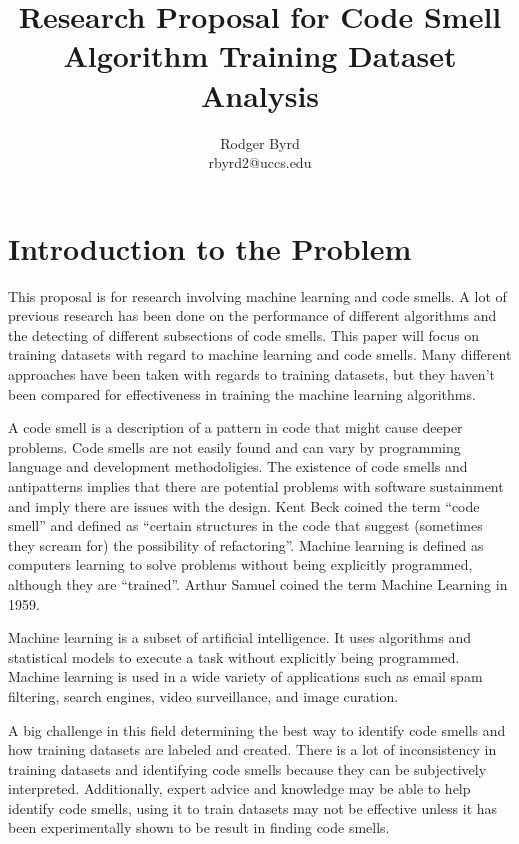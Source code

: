 \documentclass[conference]{IEEEtran}
\begin{document}

\title{Research Proposal for Code Smell Algorithm Training Dataset Analysis}
\author{Rodger Byrd\\rbyrd2@uccs.edu}
\maketitle

\section{Introduction to the Problem}
This proposal is for research involving machine learning and code smells.
A lot of previous research has been done on the performance of different algorithms and the detecting of different subsections of code smells.
This paper will focus on training datasets with regard to machine learning and code smells. 
Many different approaches have been taken with regards to training datasets, but they haven't been compared for effectiveness in training the machine learning algorithms.


A code smell is a description of a pattern in code that might cause deeper problems. 
Code smells are not easily found and can vary by programming language and development methodoligies.
The existence of code smells and antipatterns implies that there are potential problems with software sustainment and imply there are issues with the design.
Kent Beck coined the term ``code smell'' \cite{fowler_refactoring:_2018} and defined as ``certain structures in the code that suggest (sometimes they scream for) the possibility of refactoring''.
Machine learning is defined as computers learning to solve problems without being explicitly programmed, although they are ``trained''\cite{bishop_pattern_2006}. 
Arthur Samuel coined the term Machine Learning in 1959\cite{samuel_studies_1988}.


Machine learning is a subset of artificial intelligence. 
It uses algorithms and statistical models to execute a task without explicitly being programmed.
Machine learning is used in a wide variety of applications such as email spam filtering, search engines, video surveillance, and image curation.


A big challenge in this field determining the best way to identify code smells and how training datasets are labeled and created.
There is a lot of inconsistency in training datasets and identifying code smells because they can be subjectively interpreted.
Additionally, expert advice and knowledge may be able to help identify code smells, using it to train datasets may not be effective unless it has been experimentally shown to be result in finding code smells. 
\end{document}
